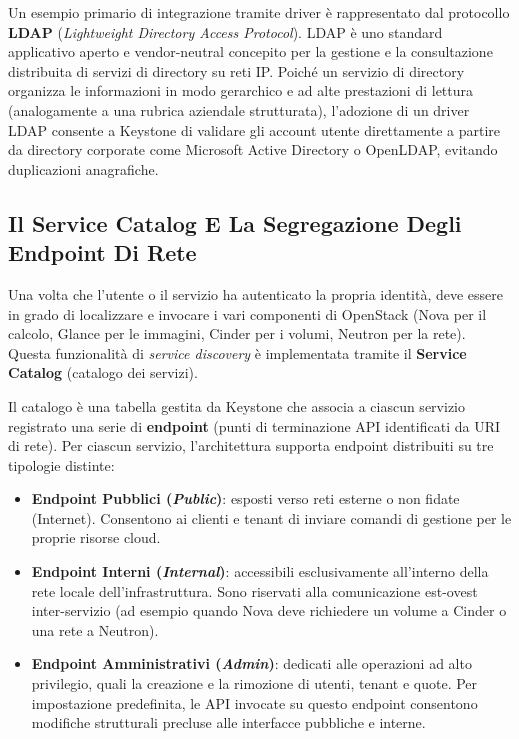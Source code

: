 \documentclass[11pt, a4paper]{article}
\begin{document}
Un esempio primario di integrazione tramite driver è rappresentato dal protocollo \textbf{LDAP} (\emph{Lightweight Directory Access Protocol}). LDAP è uno standard applicativo aperto e vendor-neutral concepito per la gestione e la consultazione distribuita di servizi di directory su reti IP. Poiché un servizio di directory organizza le informazioni in modo gerarchico e ad alte prestazioni di lettura (analogamente a una rubrica aziendale strutturata), l'adozione di un driver LDAP consente a Keystone di validare gli account utente direttamente a partire da directory corporate come Microsoft Active Directory o OpenLDAP, evitando duplicazioni anagrafiche.

\subsection{Il Service Catalog E La Segregazione Degli Endpoint Di Rete}

Una volta che l'utente o il servizio ha autenticato la propria identità, deve essere in grado di localizzare e invocare i vari componenti di OpenStack (Nova per il calcolo, Glance per le immagini, Cinder per i volumi, Neutron per la rete). Questa funzionalità di \emph{service discovery} è implementata tramite il \textbf{Service Catalog} (catalogo dei servizi).

Il catalogo è una tabella gestita da Keystone che associa a ciascun servizio registrato una serie di \textbf{endpoint} (punti di terminazione API identificati da URI di rete). Per ciascun servizio, l'architettura supporta endpoint distribuiti su tre tipologie distinte:

\begin{itemize}[noitemsep]
    \item \textbf{Endpoint Pubblici (\emph{Public})}: esposti verso reti esterne o non fidate (Internet). Consentono ai clienti e tenant di inviare comandi di gestione per le proprie risorse cloud.
    \item \textbf{Endpoint Interni (\emph{Internal})}: accessibili esclusivamente all'interno della rete locale dell'infrastruttura. Sono riservati alla comunicazione est-ovest inter-servizio (ad esempio quando Nova deve richiedere un volume a Cinder o una rete a Neutron).
    \item \textbf{Endpoint Amministrativi (\emph{Admin})}: dedicati alle operazioni ad alto privilegio, quali la creazione e la rimozione di utenti, tenant e quote. Per impostazione predefinita, le API invocate su questo endpoint consentono modifiche strutturali precluse alle interfacce pubbliche e interne.
\end{itemize}
\end{document}
